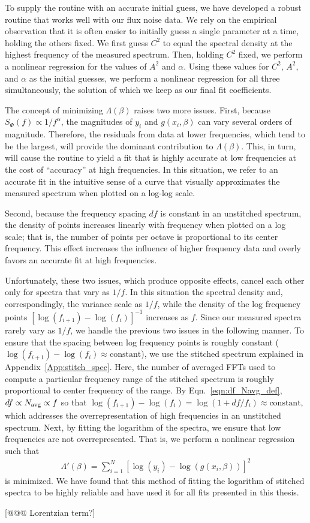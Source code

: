 To supply the routine with an accurate initial guess, we have developed a robust routine that works well with our flux noise data. We rely on the empirical observation that it is often easier to initially guess a single parameter at a time, holding the others fixed. We first guess $C^2$ to equal the spectral density at the highest frequency of the measured spectrum. Then, holding $C^2$ fixed, we perform a nonlinear regression for the values of $A^2$ and $\alpha$. Using these values for $C^2$, $A^2$, and $\alpha$ as the initial guesses, we perform a nonlinear regression for all three simultaneously, the solution of which we keep as our final fit coefficients.

The concept of minimizing $\Lambda(\beta)$ raises two more issues. First, because $S_\Phi(f) \propto 1/f^\alpha$, the magnitudes of $y_i$ and $g(x_i,\beta)$ can vary several orders of magnitude. Therefore, the residuals from data at lower frequencies, which tend to be the largest, will provide the dominant contribution to $\Lambda(\beta)$. This, in turn, will cause the routine to yield a fit that is highly accurate at low frequencies at the cost of ``accuracy'' at high frequencies. In this situation, we refer to an accurate fit in the intuitive sense of a curve that visually approximates the measured spectrum when plotted on a log-log scale.

Second, because the frequency spacing $df$ is constant in an unstitched spectrum, the density of points increases linearly with frequency when plotted on a log scale; that is, the number of points per octave is proportional to its center frequency. This effect increases the influence of higher frequency data and overly favors an accurate fit at high frequencies.

Unfortunately, these two issues, which produce opposite effects, cancel each other only for spectra that vary as $1/f$. In this situation the spectral density and, correspondingly, the variance scale as $1/f$, while the density of the log frequency points $[\log(f_{i+1}) - \log(f_i)]^{-1}$ increases as $f$. Since our measured spectra rarely vary as $1/f$, we handle the previous two issues in the following manner. To ensure that the spacing between log frequency points is roughly constant ($\log(f_{i+1}) - \log(f_i) \approx \text{constant}$), we use the stitched spectrum explained in Appendix~\ref{App:stitch_spec}. Here, the number of averaged FFTs used to compute a particular frequency range of the stitched spectrum is roughly proportional to center frequency of the range. By Eqn.~\eqref{eqn:df_Navg_def}, $df \propto N_\text{avg}{} \propto f$ so that $\log(f_{i+1}) - \log(f_i) = \log(1 + df/f_i) \approx \text{constant}$, which addresses the overrepresentation of high frequencies in an unstitched spectrum. Next, by fitting the logarithm of the spectra, we ensure that low frequencies are not overrepresented. That is, we perform a nonlinear regression such that
\begin{align}\label{eqn:sum_squared_residuals_log}
\Lambda'(\beta) = \sum_{i=1}^N [\log(y_i) - \log(g(x_i,\beta))]^2
\end{align}
is minimized. We have found that this method of fitting the logarithm of stitched spectra to be highly reliable and have used it for all fits presented in this thesis.

[@@@ Lorentzian term?]